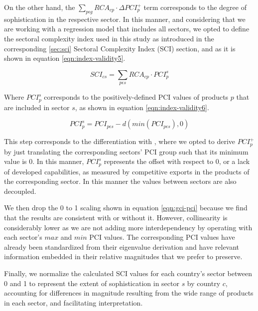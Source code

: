 \begin{appendices}
On the other hand, the $\sum_{p\epsilon g}RCA_{cp} \cdot \Delta PCI_{p}^{+}$ term corresponds to the degree of sophistication in the respective sector. In this manner, and considering that we are working with a regression model that includes all sectors, we opted to define the sectoral complexity index used in this study as introduced in the corresponding \ref{sec:sci} Sectoral Complexity Index (SCI) section, and as it is shown in equation \eqref{eqn:index-validity5}.

\begin{equation}\label{eqn:index-validity5}
    SCI_{cs} = \sum_{p\epsilon s}RCA_{cp}\cdot PCI_{p}^{s}
\end{equation}

Where $PCI_{p}^{s}$ corresponds to the positively-defined PCI values of products $p$ that are included in sector $s$, as shown in equation \eqref{eqn:index-validity6}.

\begin{equation}\label{eqn:index-validity6}
    PCI_{p}^{s} = PCI_{p\epsilon s} - d(min(PCI_{p\epsilon s}), 0)
\end{equation}

This step corresponds to the differentiation with \cite{mealyEconomicComplexityGreen2022}, where we opted to derive $PCI_{p}^{+}$ by just translating the corresponding sectors' PCI group such that its minimum value is 0. In this manner, $PCI_{p}^{s}$ represents the offset with respect to 0, or a lack of developed capabilities, as measured by competitive exports in the products of the corresponding sector. In this manner the values between sectors are also decoupled.

We then drop the 0 to 1 scaling shown in equation \eqref{eqn:gci-pci} because we find that the results are consistent with or without it. However, collinearity is considerably lower as we are not adding more interdependency by operating with each sector's $max$ and $min$ PCI values. The corresponding PCI values have already been standardized from their eigenvalue derivation and have relevant information embedded in their relative magnitudes that we prefer to preserve.

Finally, we normalize the calculated SCI values for each country's sector between 0 and 1 to represent the extent of sophistication in sector $s$ by country $c$, accounting for differences in magnitude resulting from the wide range of products in each sector, and facilitating interpretation.

\newpage


\end{appendices}
